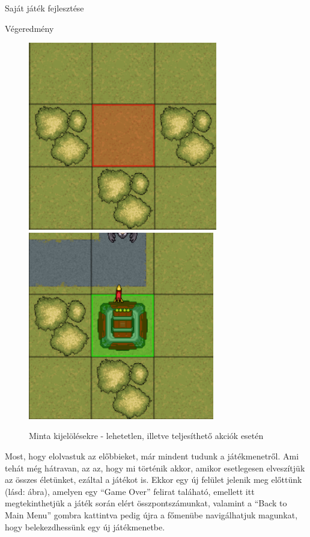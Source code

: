 \begin{MyChapter}{Saját játék fejlesztése}
\begin{MySection}{Végeredmény}
		\begin{figure}[H]
			\centering
			\includegraphics[scale=0.848]{kepek/jatekHasznalat/minta_rossz_kijeloles}
			\includegraphics[scale=0.85]{kepek/jatekHasznalat/minta_jo_kijeloles}
			\caption{Minta kijelölésekre - lehetetlen, illetve teljesíthető akciók esetén}
			\label{fig:jatekHasznalat:kijeloles_minta}
		\end{figure}
		
		
		Most, hogy elolvastuk az előbbieket, már mindent tudunk a játékmenetről. Ami tehát még hátravan, az az, hogy mi történik akkor, amikor esetlegesen elveszítjük az összes életünket, ezáltal a játékot is.
		Ekkor egy új felület jelenik meg előttünk (lásd:  ábra), amelyen egy ``Game Over'' felirat taláható, emellett itt megtekinthetjük a játék során elért összpontszámunkat, valamint a ``Back to Main Menu'' gombra kattintva pedig újra a főmenübe navigálhatjuk magunkat, hogy belekezdhessünk egy új játékmenetbe.
		

\end{MySection}
\end{MyChapter}
